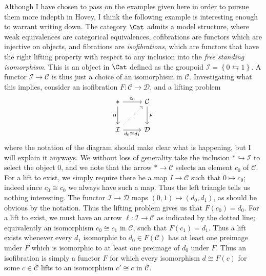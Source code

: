 \begin{example}\label{2.3.5}
	Although I have chosen to pass on the examples given here in order to pursue them more indepth in Hovey, I think the following example is interesting enough to warrant writing down. The category $\Cat $ admits a model structure, where weak equivalences are categorical equivalences, cofibrations are functors which are injective on objects, and fibrations are \emph{isofibrations}, which are functors that have the right lifting property with respect to any inclusion into the \emph{free standing isomorphism}. This is an object in $\Cat $ defined as the groupoid $\mathcal{I} =\left\{ 0\leftrightarrows 1 \right\} $. A functor $\mathcal{I} \to \mathcal{C} $ is thus just a choice of an isomorphism in $\mathcal{C} $. Investigating what this implies, consider an isofibration $F : \mathcal{C}  \to \mathcal{D} $, and a lifting problem
	\[\begin{tikzcd}[row sep = 2.5em, column sep = 2.5em]
	* \ar[" c_0 ", r] \ar[" 0 "', d]  & \mathcal{C} \ar[" F ", d]  \\
	\mathcal{I} \ar[dotted, ur] \ar[" d_0\cong d_1 "', r]  & \mathcal{D} 
	\end{tikzcd}\]
	where the notation of the diagram should make clear what is happening, but I will explain it anyways. We without loss of generality take the inclusion $*\hookrightarrow \mathcal{I} $ to select the object 0, and we note that the arrow $*\to \mathcal{C} $ selects an element $c_0$ of $\mathcal{C} $. For a lift to exist, we simply require there be a map $I\to \mathcal{C} $ such that $0\mapsto c_0$; indeed since $c_0\cong c_0$ we always have such a map. Thus the left triangle tells us nothing interesting. The functor $\mathcal{I} \to \mathcal{D} $ maps $(0,1)\mapsto (d_0,d_1)$, as should be obvious by the notation. Thus the lifting problem gives us that $F(c_0)=d_0$. For a lift to exist, we must have an arrow $\ell : \mathcal{I}  \to \mathcal{C} $ as indicated by the dotted line; equivalently an isomorphism $c_0\cong c_1$ in $\mathcal{C} $, such that $F(c_1)=d_1$. Thus a lift exists whenever every $d_1$ isomorphic to $d_0\in F(\mathcal{C} )$ has at least one preimage under $F$ which is isomorphic to at least one preimage of $d_0$ under $F$. Thus an isofibration is simply a functor $F$ for which every isomorphism $d\cong F(c)$ for some $c\in \mathcal{C} $ lifts to an isomorphism $c'\cong c$ in $\mathcal{C} $.
\end{example}

